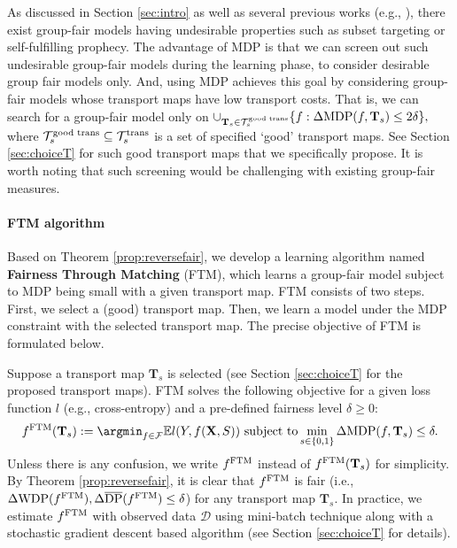 \documentclass[10pt]{article} %
\begin{document}
As discussed in Section \ref{sec:intro} as well as several previous works (e.g., \citet{10.1145/2090236.2090255}), there exist group-fair models having undesirable properties such as subset targeting or self-fulfilling prophecy.
The advantage of MDP is that we can screen out such undesirable group-fair models during the learning phase, to consider desirable group fair models only.
And, using MDP achieves this goal by considering group-fair models whose transport maps have low transport costs.
That is, we can search for a group-fair model only on $\cup_{\mathbf{T}_{s} \in \mathcal{T}_{s}^{\textup{good trans}}} \{ f: \Delta \textup{MDP}(f, \mathbf{T}_{s}) \le 2\delta \},$
where $\mathcal{T}_{s}^{\textup{good trans}} \subseteq \mathcal{T}_{s}^{\textup{trans}}$ is a set of specified `good' transport maps.
See Section \ref{sec:choiceT} for such good transport maps that we specifically propose.
It is worth noting that such screening would be challenging with existing group-fair measures.


\paragraph{FTM algorithm}

Based on Theorem \ref{prop:reversefair}, we develop a learning algorithm named \textbf{Fairness Through Matching} (FTM), which learns a group-fair model subject to MDP being small with a given transport map.
FTM consists of two steps.
First, we select a (good) transport map.
Then, we learn a model under the MDP constraint with the selected transport map.
The precise objective of FTM is formulated below.

Suppose a transport map $\mathbf{T}_{s}$ is selected (see Section \ref{sec:choiceT} for the proposed transport maps).
FTM solves the following objective for a given loss function $l$ (e.g., cross-entropy) and a pre-defined fairness level $\delta \ge 0:$
\begin{equation}\label{eq:pop_obj}
    \begin{split}
        f^{\textup{FTM}}(\mathbf{T}_{s}) := \argmin_{f \in \mathcal{F}} \mathbb{E} l(Y, f(\mathbf{X}, S)) 
        \textup{ subject to} \min_{s \in \{0, 1\}} \Delta \textup{MDP} (f, \mathbf{T}_{s}) \le \delta.
    \end{split}
\end{equation}
Unless there is any confusion, we write $f^{\textup{FTM}}$ instead of $f^{\textup{FTM}}(\mathbf{T}_{s})$ for simplicity.
By Theorem \ref{prop:reversefair}, it is clear that $f^{\textup{FTM}}$ is fair (i.e., $\Delta \textup{WDP} (f^{\textup{FTM}}), \Delta \overline{\textup{DP}} (f^{\textup{FTM}}) \le \delta$) for any transport map $\mathbf{T}_{s}.$
In practice, we estimate $f^{\textup{FTM}}$ with observed data $\mathcal{D}$ using mini-batch technique along with a stochastic gradient descent based algorithm (see Section \ref{sec:choiceT} for details).
\end{document}
